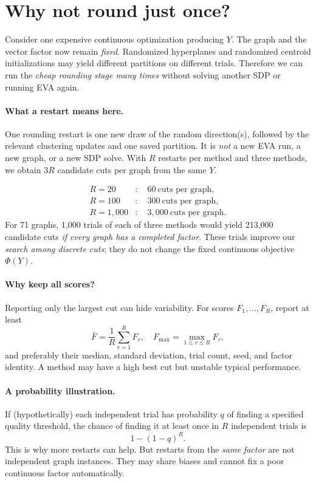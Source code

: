 \documentclass[10pt,letterpaper]{article}
\begin{document}
\section{Why not round just once?}
\label{sec:restarts}
Consider one expensive continuous optimization producing $Y$. The graph and the vector factor now remain \emph{fixed}. Randomized hyperplanes and randomized centroid initializations may yield different partitions on different trials. Therefore we can run the \emph{cheap rounding stage many times} without solving another SDP or running EVA again.

\paragraph{What a restart means here.} One rounding restart is one new draw of the random direction(s), followed by the relevant clustering updates and one saved partition. It is \emph{not} a new EVA run, a new graph, or a new SDP solve. With $R$ restarts per method and three methods, we obtain $3R$ candidate cuts per graph from the same $Y$.

\begin{equation}\label{eq:trialcounts}
 \begin{aligned}
 R=20&:\quad60\ \text{cuts per graph},\\
 R=100&:\quad300\ \text{cuts per graph},\\
 R=1{,}000&:\quad3{,}000\ \text{cuts per graph}.
 \end{aligned}
\end{equation}
For 71 graphs, 1,000 trials of each of three methods would yield 213,000 candidate cuts \emph{if every graph has a completed factor}. These trials improve our \emph{search among discrete cuts}; they do not change the fixed continuous objective $\Phi(Y)$.

\paragraph{Why keep all scores?} Reporting only the largest cut can hide variability. For scores $F_1,\ldots,F_R$, report at least
\begin{equation}
 \bar F=\frac1R\sum_{r=1}^RF_r,
 \quad F_{\max}=\max_{1\le r\le R}F_r,
\end{equation}
and preferably their median, standard deviation, trial count, seed, and factor identity. A method may have a high best cut but unstable typical performance.

\paragraph{A probability illustration.} If (hypothetically) each independent trial has probability $q$ of finding a specified quality threshold, the chance of finding it at least once in $R$ independent trials is
\begin{equation}\label{eq:repeated}
 1-(1-q)^R.
\end{equation}
This is why more restarts can help. But restarts from the \emph{same factor} are not independent graph instances. They may share biases and cannot fix a poor continuous factor automatically.
\end{document}
